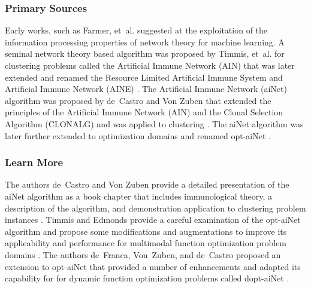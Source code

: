 \subsubsection{Primary Sources}
Early works, such as Farmer, et~al. \cite{Farmer1986} suggested at the exploitation of the information processing properties of network theory for machine learning.
A seminal network theory based algorithm was proposed by Timmis, et~al. for clustering problems called the Artificial Immune Network (AIN) \cite{Timmis2000} that was later extended and renamed the Resource Limited Artificial Immune System \cite{Timmis2001} and Artificial Immune Network (AINE) \cite{Knight2001}.
The Artificial Immune Network (aiNet) algorithm was proposed by de~Castro and Von Zuben that extended the principles of the Artificial Immune Network (AIN) and the Clonal Selection Algorithm (CLONALG) and was applied to clustering \cite{Castro2000a}. The aiNet algorithm was later further extended to optimization domains and renamed opt-aiNet \cite{Castro2002c}.

% 
% 
\subsubsection{Learn More}
The authors de~Castro and Von Zuben provide a detailed presentation of the aiNet algorithm as a book chapter that includes immunological theory, a description of the algorithm, and demonstration application to clustering problem instances \cite{Castro2001}.
Timmis and Edmonds provide a careful examination of the opt-aiNet algorithm and propose some modifications and augmentations to improve its applicability and performance for multimodal function optimization problem domains \cite{Timmis2004}.
The authors de~Franca, Von~Zuben, and de~Castro proposed an extension to opt-aiNet that provided a number of enhancements and adapted its capability for for dynamic function optimization problems called dopt-aiNet \cite{Franca2005}.


